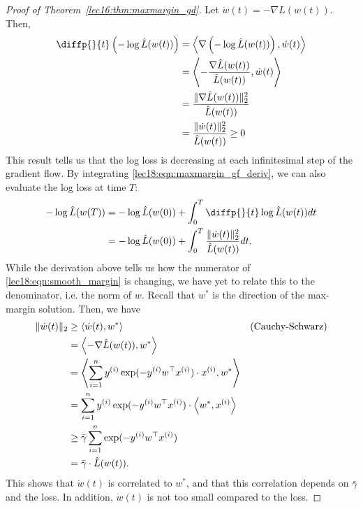 \begin{proof}[Proof of Theorem~\ref{lec16:thm:maxmargin_gd}]
Let $\dot{w}(t)= -\nabla \hat L(w(t))$. Then,
\begin{align}
    \diffp{}{t} \l (-\log \hat{L}(w(t)) \r ) &= \inprod{\nabla\l ( -\log  \hat{L}(w(t)) \r ),\dot{w}(t)} \\
    &=\left \langle -\frac{\nabla\hat{L}(w(t))}{\hat{L}(w(t))},\dot{w}(t) \right \rangle \\
    &=\frac{\norm{\nabla\hat{L}(w(t))}_2^2}{\hat{L}(w(t))} \\
    &=\frac{\norm{\dot{w}(t)}_2^2}{\hat{L}(w(t))} \geq 0 \label{lec18:eqn:maxmargin_gf_deriv}
\end{align}
This result tells us that the log loss is decreasing at each infinitesimal step of the gradient flow. By integrating \eqref{lec18:eqn:maxmargin_gf_deriv}, we can also evaluate the log loss at time $T$:
\begin{align}
    -\log\hat{L} (w(T) ) &= -\log\hat{L}(w(0)) + \int_0^T \diffp{}{t}\log\hat{L}(w(t)) dt \label{lec18:eqn:gf_wt_expansion} \\
    &= -\log \hat{L}(w(0)) + \int_0^T \frac{\|\dot{w}(t)\|_2^2}{\hat{L}(w(t))} dt.
\end{align}
While the derivation above tells us how the numerator of \eqref{lec18:eqn:smooth_margin} is changing, we have yet to relate this to the denominator, i.e. the norm of $w$. Recall that $w^*$ is the direction of the max-margin solution. Then, we have
\begin{align}
    \|\dot{w}(t)\|_2 &\geq \left\langle\dot{w}(t), w^*\right\rangle &\text{(Cauchy-Schwarz)} \label{lec18:eqn:cs-dotw} \\
    & = \left\langle-\nabla \hat L(w(t)), w^*\right\rangle \\
    &= \left\langle \sum_{i=1}^n y^{(i)}\exp(-y^{(i)}w^\top x^{(i)})\cdot x^{(i)}, w^* \right\rangle \\
    &= \sum_{i=1}^n y^{(i)}\exp(-y^{(i)}w^\top x^{(i)})\cdot \left\langle w^*,  x^{(i)}\right\rangle \\
    &\geq \bar{\gamma}\sum_{i=1}^n \exp(-y^{(i)}w^\top x^{(i)}) \\
    &=\bar{\gamma} \cdot \hat{L}(w(t)).
\end{align}
This shows that $\dot{w}(t)$ is correlated to $w^*$, and that this correlation depends on $\bar{\gamma}$ and the loss. In addition, $\dot{w}(t)$ is not too small compared to the loss.


\end{proof}
